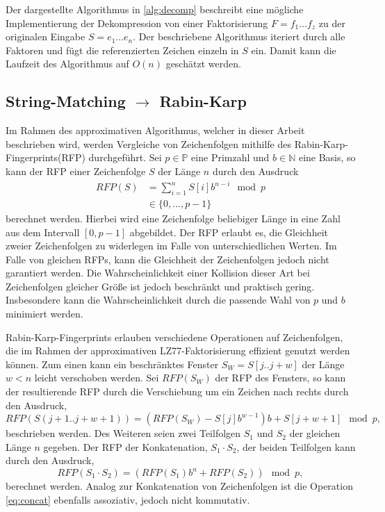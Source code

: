 Der dargestellte Algorithmus in \ref{alg:decomp} beschreibt eine mögliche Implementierung der Dekompression von einer Faktorisierung $F=f_1...f_z$ zu der originalen Eingabe
$S=e_1...e_n$. Der beschriebene Algorithmus iteriert durch alle Faktoren und fügt die referenzierten Zeichen einzeln in $S$ ein. Damit kann die Laufzeit des 
Algorithmus auf $O(n)$ geschätzt werden.

\subsection{String-Matching $\rightarrow$ Rabin-Karp}
Im Rahmen des approximativen Algorithmus, welcher in dieser Arbeit beschrieben wird, werden Vergleiche von Zeichenfolgen mithilfe des Rabin-Karp-Fingerprints(RFP) \cite{rfp}
durchgeführt. Sei
$p\in \mathbb{P}$ eine Primzahl und $b\in \mathbb{N}$ eine Basis, so kann der RFP einer Zeichenfolge $S$ der Länge $n$ durch den Ausdruck
\begin{equation}
    \begin{split}
    RFP(S) &= \sum_{i=1}^{n} S[i]b^{n-i} \mod p \\
    &\in \{0,...,p-1\}
    \end{split}
\end{equation}
berechnet werden. Hierbei wird eine Zeichenfolge beliebiger Länge in eine Zahl aus dem Intervall $[0,p-1]$ abgebildet. Der RFP erlaubt es, die Gleichheit zweier Zeichenfolgen zu widerlegen
im Falle von unterschiedlichen Werten. Im Falle von gleichen RFPs, kann die Gleichheit der Zeichenfolgen jedoch nicht garantiert werden. Die Wahrscheinlichkeit einer Kollision 
dieser Art bei Zeichenfolgen gleicher Größe ist jedoch beschränkt und praktisch gering. Insbesondere kann die Wahrscheinlichkeit durch die passende Wahl von $p$ und $b$ 
minimiert werden.

Rabin-Karp-Fingerprints erlauben verschiedene Operationen auf Zeichenfolgen, die im Rahmen der approximativen LZ77-Faktorisierung effizient genutzt werden können. Zum einen kann ein
beschränktes Fenster $S_{W} = S[j..j+w]$ der Länge $w<n$ leicht verschoben werden. Sei $RFP(S_{W})$ der RFP des Fensters, so kann der resultierende RFP durch die Verschiebung um 
ein Zeichen nach rechts durch den Ausdruck,
\begin{equation} \label{eq:shift}
    RFP(S(j+1..j+w+1)) = (RFP(S_W) - S[j]b^{w-1})b + S[j+w+1] \mod p,
\end{equation}
beschrieben werden. Des Weiteren seien zwei Teilfolgen $S_1$ und $S_2$ der gleichen Länge $n$ gegeben. Der RFP der Konkatenation, $S_1\cdot S_2$, der beiden Teilfolgen kann durch den Ausdruck,
\begin{equation} \label{eq:concat}
    RFP(S_1\cdot S_2) = (RFP(S_1)b^n + RFP(S_2)) \mod p,
\end{equation}
berechnet werden. Analog zur Konkatenation von Zeichenfolgen ist die Operation \ref{eq:concat} ebenfalls assoziativ, jedoch nicht kommutativ.


